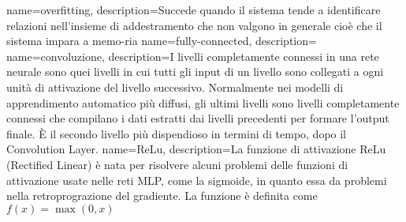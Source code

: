 \makeglossaries

{
    name=overfitting,
    description={Succede quando il sistema tende  a identificare relazioni nell’insieme di addestramento che non valgono in generale cioè che il sistema impara a memo-ria}
}
{
    name=fully-connected,
    description={}
}
{
    name=convoluzione,
    description={I livelli completamente connessi in una rete neurale sono quei livelli in cui tutti gli input di
    un livello sono collegati a ogni unità di attivazione del livello successivo. Normalmente nei modelli di
    apprendimento automatico più diffusi, gli ultimi livelli sono livelli completamente connessi
    che compilano i dati estratti dai livelli precedenti per formare l’output finale. È il secondo
    livello più dispendioso in termini di tempo, dopo il Convolution Layer.}
}
{
    name=ReLu,
    description={La funzione di attivazione ReLu (Rectified Linear) è nata per risolvere alcuni problemi delle funzioni di attivazione usate nelle reti MLP, come la sigmoide, in quanto essa da problemi nella retroprograzione del gradiente. La funzione è definita come \(f(x) = \max (0, x)\)}
}